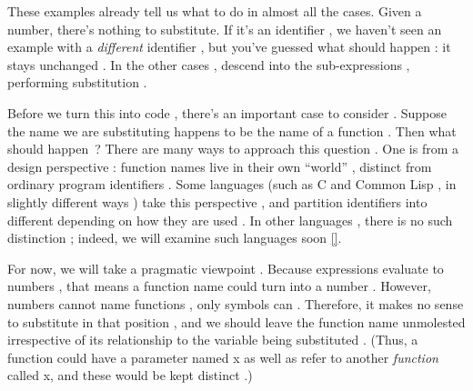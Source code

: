 \clearpage
These examples already tell us what to do in almost all the cases.  Given a number,
there’s nothing to substitute.  If it’s an
identifier , we haven’t seen an example with a
\emph{different} identifier , but you’ve guessed what should happen : it stays unchanged . In the
other cases , descend into the sub-expressions , performing substitution .

Before we turn this into code ,
there’s an important case to consider .
Suppose the name we are substituting happens to be the name of a function
. Then what
should happen \,?
There are many ways to approach this question . One is from a design perspective : function names live in their own ``world'' , distinct from ordinary program identifiers . Some languages  (such as C and Common Lisp , in
slightly different ways ) take this perspective
, and partition identifiers into different
  depending on how they are used
. In other languages , there is no such distinction ; indeed, we
will examine such languages soon  \ref{}.

For now, we will take a pragmatic viewpoint . Because expressions evaluate to numbers , that means a function name could turn into a number
. However, numbers
cannot name functions , only
symbols can . Therefore, it makes no sense
to substitute in that position , and we should leave the function name unmolested  irrespective of its relationship to the
variable being substituted . (Thus, a function could have a parameter named  x as well as refer to another
\emph{function} called  x, and these would be kept distinct .)

